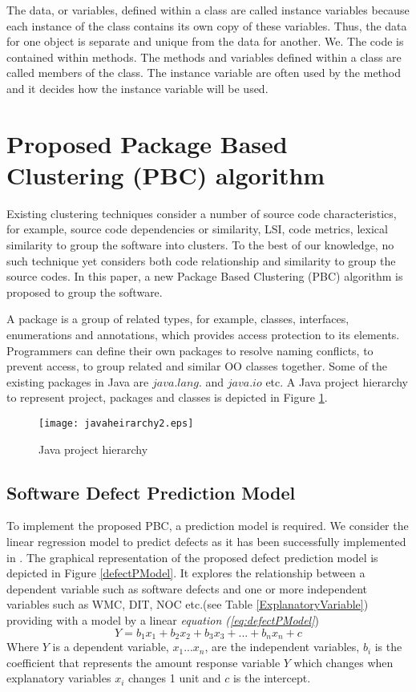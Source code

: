 \documentclass[12pt]{report}
\begin{document}
The data, or variables, defined within a class are called instance variables because each instance of the class contains its own copy of these variables. Thus, the data for one object is separate and unique from the data for another. We. The code is contained within methods. The methods and variables defined within a class are called members of the class. The instance variable are often used by the method and it decides how the instance variable will be used.  

\section{Proposed Package Based Clustering (PBC) algorithm}

Existing clustering techniques consider a number of source code characteristics, for example, source code dependencies or similarity, LSI, code metrics, lexical similarity to group the software into clusters. To the best of our knowledge, no such technique yet considers both code relationship and similarity to group the source codes. In this paper, a new Package Based Clustering (PBC) algorithm is proposed to group the software. 

A package is a group of related types, for example, classes, interfaces, enumerations and annotations, which provides access protection to its elements. Programmers can define their own packages to resolve naming conflicts, to prevent access, to group related and similar OO classes together. Some of the existing packages in Java are $java.lang.$ and $java.io$ etc. A Java project hierarchy to represent project, packages and classes is depicted in Figure \ref{JavaStructure}.

\begin{figure}[h!]
\centering
      \texttt{[image: javaheirarchy2.eps]}
			\caption{Java project hierarchy}
			\label{JavaStructure}
\end{figure}


\subsection{Software Defect Prediction Model}
To implement the proposed PBC, a prediction model is required. We consider the linear regression model \cite{draper1981applied} to predict defects as it has been successfully implemented in \cite{tan2011assessing,basili1996validation}. The graphical representation of the proposed defect prediction model is depicted in {Figure \ref{defectPModel}. It explores the relationship between a dependent variable such as software defects and one or more independent variables such as WMC, DIT, NOC etc.(see Table \ref{ExplanatoryVariable}) providing with a model by a linear \textit{equation (\ref{eq:defectPModel}}) 
\begin{equation}
\label{eq:defectPModel}
 Y=b_{1}x_{1}+b_{2}x_{2}+b_{3}x_{3}+...+b_{n}x_{n}+c
\end{equation}}
Where $Y$ is a dependent variable, $x_{1}...x_{n}$, are the independent variables, $b_{i}$ is the coefficient that represents the amount response variable $Y$ which changes when explanatory variables $x_{i}$ changes 1 unit and $c$ is the intercept.
\end{document}
